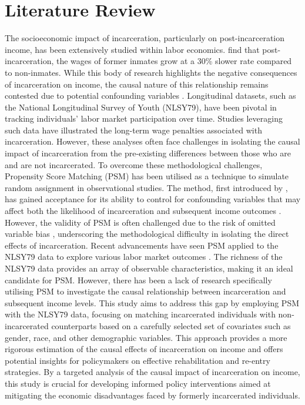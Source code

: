 \documentclass{article}[12pt]
\begin{document}
\section{Literature Review} %
The socioeconomic impact of incarceration, particularly on post-incarceration income, has been extensively studied within labor economics. \cite{western2000effects} find that post-incarceration, the wages of former inmates grow at a 30\% slower rate compared to non-inmates. While this body of research highlights the negative consequences of incarceration on income, the causal nature of this relationship remains contested due to potential confounding variables \citep{apel2010impact}. Longitudinal datasets, such as the National Longitudinal Survey of Youth (NLSY79), have been pivotal in tracking individuals’ labor market participation over time. Studies leveraging such data \citep{western2006punishment} have illustrated the long-term wage penalties associated with incarceration. However, these analyses often face challenges in isolating the causal impact of incarceration from the pre-existing differences between those who are and are not incarcerated. To overcome these methodological challenges, Propensity Score Matching (PSM) has been utilised as a technique to simulate random assignment in observational studies. The method, first introduced by \cite{rosenbaum1983central}, has gained acceptance for its ability to control for confounding variables that may affect both the likelihood of incarceration and subsequent income outcomes \citep{dehejia2002propensity}. However, the validity of PSM is often challenged due to the risk of omitted variable bias \citep{smith2005does}, underscoring the methodological difficulty in isolating the direct effects of incarceration. Recent advancements have seen PSM applied to the NLSY79 data to explore various labor market outcomes \citep{hotchkiss2018effects}. The richness of the NLSY79 data provides an array of observable characteristics, making it an ideal candidate for PSM. However, there has been a lack of research specifically utilising PSM to investigate the causal relationship between incarceration and subsequent income levels. This study aims to address this gap by employing PSM with the NLSY79 data, focusing on matching incarcerated individuals with non-incarcerated counterparts based on a carefully selected set of covariates such as gender, race, and other demographic variables. This approach provides a more rigorous estimation of the causal effects of incarceration on income and offers potential insights for policymakers on effective rehabilitation and re-entry strategies. By a targeted analysis of the causal impact of incarceration on income, this study is crucial for developing informed policy interventions aimed at mitigating the economic disadvantages faced by formerly incarcerated individuals.
\end{document}

